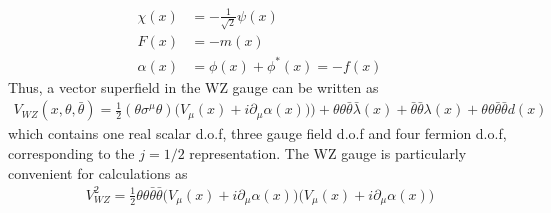 \begin{align}
    \chi(x)&=-\frac{1}{\sqrt{2}}\psi(x)
    \\
    F(x)&=-m(x)
    \\
    \alpha(x)&=\phi(x)+\phi^{*}(x)=-f(x)
\end{align}
Thus, a vector superfield in the WZ gauge can be written as
\begin{align}
    V_{WZ}(x,\theta,\bar{\theta})=\frac{1}{2}(\theta\sigma^{\mu}\theta)\big(V_{\mu}(x)+i\partial_{\mu}\alpha(x))\big)+\theta\theta\bar{\theta}\bar{\lambda}(x)+\bar{\theta}\bar{\theta}\lambda(x)+\theta\theta\bar{\theta}\bar{\theta}d(x)
\end{align}
which contains one real scalar d.o.f, three gauge field d.o.f and four fermion d.o.f, corresponding to the $j=1/2$ representation. The WZ gauge is particularly convenient for calculations as
\begin{align}
    V_{WZ}^{2}=\frac{1}{2}\theta\theta\bar{\theta}\bar{\theta}\big(V_{\mu}(x)+i\partial_{\mu}\alpha(x)\big)\big(V_{\mu}(x)+i\partial_{\mu}\alpha(x)\big)
\end{align}


